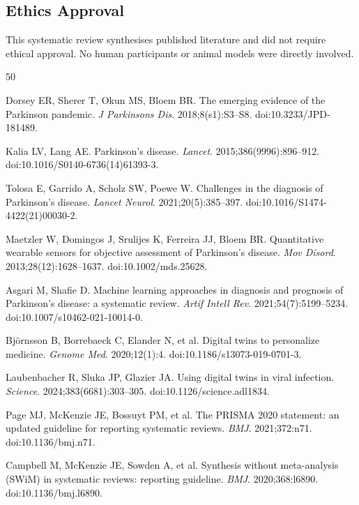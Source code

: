 \documentclass[11pt,a4paper]{article}
\begin{document}
\subsection*{Ethics Approval}
This systematic review synthesises published literature and did not require ethical approval. No human participants or animal models were directly involved.

\begin{thebibliography}{50}
\small

Dorsey ER, Sherer T, Okun MS, Bloem BR.
The emerging evidence of the Parkinson pandemic.
\textit{J Parkinsons Dis}. 2018;8(s1):S3--S8.
doi:10.3233/JPD-181489.

Kalia LV, Lang AE.
Parkinson's disease.
\textit{Lancet}. 2015;386(9996):896--912.
doi:10.1016/S0140-6736(14)61393-3.

Tolosa E, Garrido A, Scholz SW, Poewe W.
Challenges in the diagnosis of Parkinson's disease.
\textit{Lancet Neurol}. 2021;20(5):385--397.
doi:10.1016/S1474-4422(21)00030-2.

Maetzler W, Domingos J, Srulijes K, Ferreira JJ, Bloem BR.
Quantitative wearable sensors for objective assessment of Parkinson's disease.
\textit{Mov Disord}. 2013;28(12):1628--1637.
doi:10.1002/mds.25628.

Asgari M, Shafie D.
Machine learning approaches in diagnosis and prognosis of Parkinson's disease: a systematic review.
\textit{Artif Intell Rev}. 2021;54(7):5199--5234.
doi:10.1007/s10462-021-10014-0.

Bj\"ornsson B, Borrebaeck C, Elander N, et al.
Digital twins to personalize medicine.
\textit{Genome Med}. 2020;12(1):4.
doi:10.1186/s13073-019-0701-3.

Laubenbacher R, Sluka JP, Glazier JA.
Using digital twins in viral infection.
\textit{Science}. 2024;383(6681):303--305.
doi:10.1126/science.adl1834.

Page MJ, McKenzie JE, Bossuyt PM, et al.
The PRISMA 2020 statement: an updated guideline for reporting systematic reviews.
\textit{BMJ}. 2021;372:n71.
doi:10.1136/bmj.n71.

Campbell M, McKenzie JE, Sowden A, et al.
Synthesis without meta-analysis (SWiM) in systematic reviews: reporting guideline.
\textit{BMJ}. 2020;368:l6890.
doi:10.1136/bmj.l6890.


\end{thebibliography}
\end{document}
